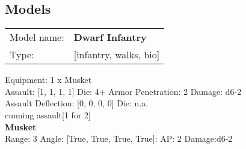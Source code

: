 \pagebreak

\subsection{ Models }

\begin{tabular}{ll}
Model name: & {\bf Dwarf Infantry } \\
Type: & [infantry, walks, bio] \\
\end{tabular}

Equipment: 1 x Musket \\

Assault: [1, 1, 1, 1] Die: 4+ Armor Penetration: 2 Damage: d6-2 \\
Assault Deflection: [0, 0, 0, 0] Die: n.a.\\
\indent cunning assault[1 for 2]\\ 
 



{\bf Musket } \\



Range: 3  Angle: [True, True, True, True]: AP: 2 Damage:d6-2 \\




 















\pagebreak